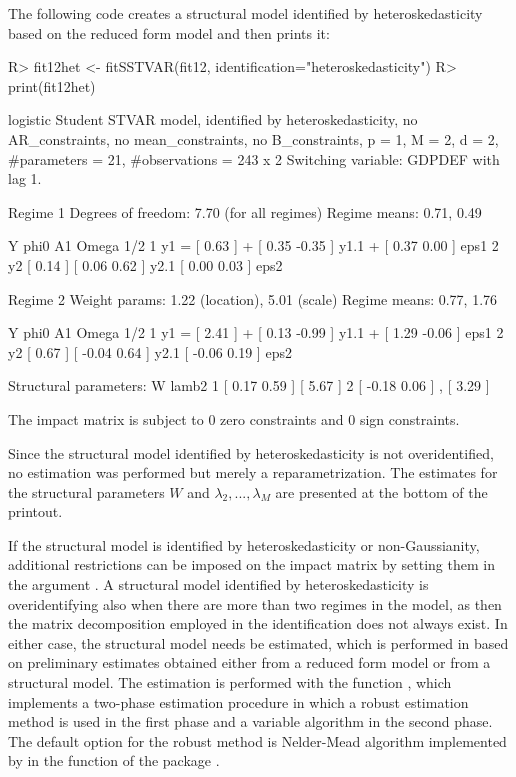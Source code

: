 \documentclass[nojss]{jss}
\begin{document}
The following code creates a structural model identified by heteroskedasticity based on the reduced form model  and then prints it:
\begin{CodeChunk}
\begin{CodeInput}
R> fit12het <- fitSSTVAR(fit12, identification="heteroskedasticity")
R> print(fit12het)
\end{CodeInput}
\begin{CodeOutput}
logistic Student STVAR model, identified by heteroskedasticity, no AR_constraints,
no mean_constraints, no B_constraints,
  p = 1, M = 2, d = 2, #parameters = 21, #observations = 243 x 2
  Switching variable: GDPDEF with lag 1.

Regime 1
Degrees of freedom: 7.70 (for all regimes)
Regime means: 0.71, 0.49

   Y     phi0          A1                  Omega        1/2
1 y1 = [ 0.63 ] + [  0.35 -0.35 ] y1.1 + [  0.37 0.00 ]     eps1
2 y2   [ 0.14 ]   [  0.06  0.62 ] y2.1   [  0.00 0.03 ]     eps2

Regime 2
Weight params: 1.22 (location), 5.01 (scale)
Regime means: 0.77, 1.76

   Y     phi0          A1                  Omega         1/2
1 y1 = [ 2.41 ] + [  0.13 -0.99 ] y1.1 + [  1.29 -0.06 ]     eps1
2 y2   [ 0.67 ]   [ -0.04  0.64 ] y2.1   [ -0.06  0.19 ]     eps2

Structural parameters:
        W             lamb2
1 [  0.17  0.59 ]   [  5.67 ]
2 [ -0.18  0.06 ] , [  3.29 ]

The impact matrix is subject to 0 zero constraints and 0 sign constraints.
\end{CodeOutput}
\end{CodeChunk}
%
Since the structural model identified by heteroskedasticity is not overidentified, no estimation was performed but merely a reparametrization. The estimates for the structural parameters $W$ and $\lambda_2,...,\lambda_M$ are presented at the bottom of the printout.

If the structural model is identified by heteroskedasticity or non-Gaussianity, additional restrictions can be imposed on the impact matrix by setting them in the argument . A structural model identified by heteroskedasticity is overidentifying also when there are more than two regimes in the model, as then the matrix decomposition employed in the identification does not always exist. In either case, the structural model needs be estimated, which is performed in  based on preliminary estimates obtained either from a reduced form model or from a structural model. The estimation is performed with the function , which implements a two-phase estimation procedure in which a robust estimation method is used in the first phase and a variable algorithm in the second phase. The default option for the robust method is Nelder-Mead algorithm implemented by \cite{R} in the function  of the package .
\end{document}
